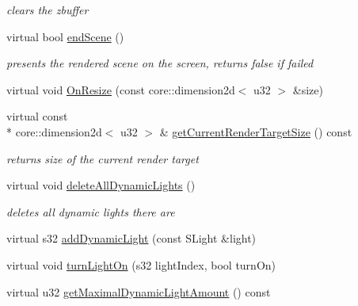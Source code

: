 \begin{DoxyCompactItemize}
\begin{DoxyCompactList}\small\item\em clears the zbuffer \end{DoxyCompactList}\item 
\hypertarget{classirr_1_1video_1_1_c_burning_video_driver_a5b8429155a45610cb06f2a99d35ecc62}{virtual bool \hyperlink{classirr_1_1video_1_1_c_burning_video_driver_a5b8429155a45610cb06f2a99d35ecc62}{end\-Scene} ()}\label{classirr_1_1video_1_1_c_burning_video_driver_a5b8429155a45610cb06f2a99d35ecc62}

\begin{DoxyCompactList}\small\item\em presents the rendered scene on the screen, returns false if failed \end{DoxyCompactList}\item 
virtual void \hyperlink{classirr_1_1video_1_1_c_burning_video_driver_a0e4ca60b6493a3d28964db851fb7fd74}{On\-Resize} (const core\-::dimension2d$<$ u32 $>$ \&size)
\item 
\hypertarget{classirr_1_1video_1_1_c_burning_video_driver_adf6f8a8334f7a9bae53b6d9ebc94120a}{virtual const \\*
core\-::dimension2d$<$ u32 $>$ \& \hyperlink{classirr_1_1video_1_1_c_burning_video_driver_adf6f8a8334f7a9bae53b6d9ebc94120a}{get\-Current\-Render\-Target\-Size} () const }\label{classirr_1_1video_1_1_c_burning_video_driver_adf6f8a8334f7a9bae53b6d9ebc94120a}

\begin{DoxyCompactList}\small\item\em returns size of the current render target \end{DoxyCompactList}\item 
\hypertarget{classirr_1_1video_1_1_c_burning_video_driver_acdc2cce0f8ae3784da52e03059c8cd1b}{virtual void \hyperlink{classirr_1_1video_1_1_c_burning_video_driver_acdc2cce0f8ae3784da52e03059c8cd1b}{delete\-All\-Dynamic\-Lights} ()}\label{classirr_1_1video_1_1_c_burning_video_driver_acdc2cce0f8ae3784da52e03059c8cd1b}

\begin{DoxyCompactList}\small\item\em deletes all dynamic lights there are \end{DoxyCompactList}\item 
virtual s32 \hyperlink{classirr_1_1video_1_1_c_burning_video_driver_a9bdb25930021ddc4015756e5d373d230}{add\-Dynamic\-Light} (const S\-Light \&light)
\item 
virtual void \hyperlink{classirr_1_1video_1_1_c_burning_video_driver_a78390fa09f6cba3be4d5525158b7faa4}{turn\-Light\-On} (s32 light\-Index, bool turn\-On)
\item 
\hypertarget{classirr_1_1video_1_1_c_burning_video_driver_a0d192a02ef8bcddb125dee3a7c3770a1}{virtual u32 \hyperlink{classirr_1_1video_1_1_c_burning_video_driver_a0d192a02ef8bcddb125dee3a7c3770a1}{get\-Maximal\-Dynamic\-Light\-Amount} () const }\label{classirr_1_1video_1_1_c_burning_video_driver_a0d192a02ef8bcddb125dee3a7c3770a1}


\end{DoxyCompactItemize}
